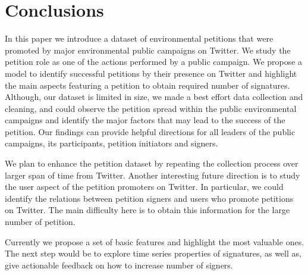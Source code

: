 \section{Conclusions}
In this paper we introduce a dataset of environmental petitions that were promoted by major environmental public campaigns on Twitter.
We study the petition role as one of the actions performed by a public campaign.
We propose a model to identify successful petitions by their presence on Twitter and highlight the main aspects featuring a petition to obtain required number of signatures.
Although, our dataset is limited in size, we made a best effort data collection and cleaning, and could observe the petition spread within the public environmental campaigns and identify the major factors that may lead to the success of the petition.
Our findings can provide helpful directions for all leaders of the public campaigns, its participants, petition initiators and signers.

We plan to enhance the petition dataset by repeating the collection process over larger span of time from Twitter.
Another interesting future direction is to study the user aspect of the petition promoters on Twitter. In particular, we could identify the relations between petition signers and users who promote petitions on Twitter. The main difficulty here is to obtain this information for the large number of petition.

Currently we propose a set of basic features and highlight the most valuable ones. The next step would be to explore time series properties of signatures, as well as, give actionable feedback on how to increase number of signers.